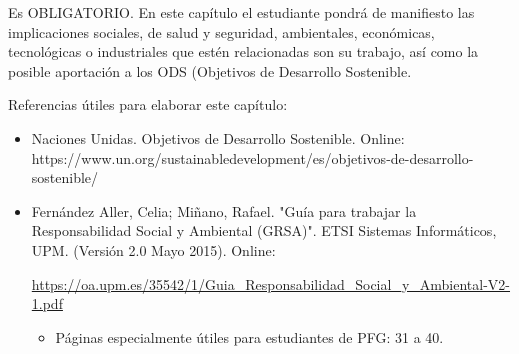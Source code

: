 \noindent Es OBLIGATORIO.
En este capítulo el estudiante pondrá de manifiesto las implicaciones sociales, de salud y seguridad, ambientales, económicas, tecnológicas o industriales que estén relacionadas son su trabajo, así como la posible aportación a los ODS (Objetivos de Desarrollo Sostenible.

Referencias útiles para elaborar este capítulo:
\begin{itemize}
    \item Naciones Unidas. Objetivos de Desarrollo Sostenible. Online: https://www.un.org/sustainabledevelopment/es/objetivos-de-desarrollo-sostenible/
    \item Fernández Aller, Celia; Miñano, Rafael. "Guía para trabajar la Responsabilidad Social y Ambiental (GRSA)". ETSI Sistemas Informáticos, UPM. (Versión 2.0 Mayo 2015). Online: 
    
    \href{https://oa.upm.es/35542/1/Guia_Responsabilidad_Social_y_Ambiental-V2-1.pdf}{https://oa.upm.es/35542/1/Guia\_Responsabilidad\_Social\_y\_Ambiental-V2-1.pdf}
    \begin{itemize}
        \item Páginas especialmente útiles para estudiantes de PFG: 31 a 40.
    \end{itemize}
\end{itemize}

